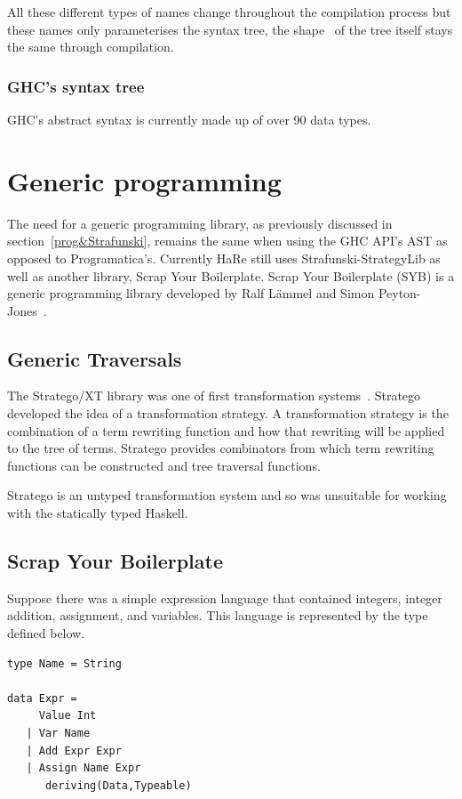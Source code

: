 All these different types of names change throughout the compilation process but these names only parameterises the syntax tree, the shape~ of the tree itself stays the same through compilation. 

\subsubsection{GHC's syntax tree}
GHC's abstract syntax is currently made up of over 90 data types. 


\section{Generic programming}
The need for a generic programming library, as previously discussed in section~\ref{prog&Strafunski}, remains the same when using the GHC API's AST as opposed to Programatica's. Currently HaRe still uses Strafunski-StrategyLib as well as another library, Scrap Your Boilerplate. Scrap Your Boilerplate (SYB) is a generic programming library developed by Ralf L{\"a}mmel and Simon Peyton-Jones~\citep{syb}.
\subsection{Generic Traversals}
The Stratego/XT library was one of first transformation systems~\citep{stratego}. Stratego developed the idea of a transformation strategy. A transformation strategy is the combination of a term rewriting function and how that rewriting will be applied to the tree of terms. Stratego provides combinators from which term rewriting functions can be constructed and tree traversal functions\citep{stratego}.

Stratego is an untyped transformation system and so was unsuitable for working with the statically typed Haskell.  
\subsection{Scrap Your Boilerplate}\label{syb}

	Suppose there was a simple expression language that contained integers, integer addition, assignment, and variables. This language is represented by the type defined below.
	
	\begin{verbatim}
type Name = String

data Expr =
     Value Int
   | Var Name
   | Add Expr Expr
   | Assign Name Expr
      deriving(Data,Typeable)
	\end{verbatim}
	
